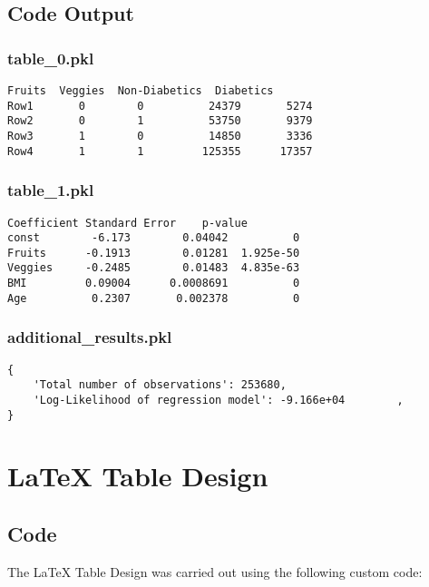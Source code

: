 \documentclass[11pt]{article}
\begin{document}
\subsection{Code Output}

\subsubsection*{table\_0.pkl}

\begin{Verbatim}[tabsize=4]
      Fruits  Veggies  Non-Diabetics  Diabetics
Row1       0        0          24379       5274
Row2       0        1          53750       9379
Row3       1        0          14850       3336
Row4       1        1         125355      17357
\end{Verbatim}

\subsubsection*{table\_1.pkl}

\begin{Verbatim}[tabsize=4]
        Coefficient Standard Error    p-value
const        -6.173        0.04042          0
Fruits      -0.1913        0.01281  1.925e-50
Veggies     -0.2485        0.01483  4.835e-63
BMI         0.09004      0.0008691          0
Age          0.2307       0.002378          0
\end{Verbatim}

\subsubsection*{additional\_results.pkl}

\begin{Verbatim}[tabsize=4]
{
    'Total number of observations': 253680,
    'Log-Likelihood of regression model': -9.166e+04        ,
}
\end{Verbatim}

\section{LaTeX Table Design} \subsection{Code}The LaTeX Table Design was carried out using the following custom code:
\end{document}
